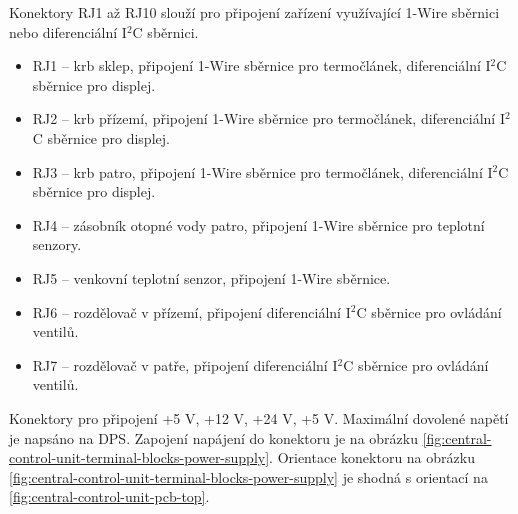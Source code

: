\begin{Czech}
\end{Czech}

\begin{Czech}
Konektory RJ1 až RJ10 slouží pro připojení zařízení využívající 1-Wire sběrnici nebo diferenciální I$^2$C sběrnici.
\end{Czech}

\begin{Czech}
\begin{itemize}
  \item RJ1 – krb sklep, připojení 1-Wire sběrnice pro termočlánek, diferenciální I$^2$C sběrnice pro displej.
  \item RJ2 – krb přízemí, připojení 1-Wire sběrnice pro termočlánek, diferenciální I$^2$C sběrnice pro displej.
  \item RJ3 – krb patro, připojení 1-Wire sběrnice pro termočlánek, diferenciální I$^2$C sběrnice pro displej.
  \item RJ4 – zásobník otopné vody patro, připojení 1-Wire sběrnice pro teplotní senzory.
  \item RJ5 – venkovní teplotní senzor, připojení 1-Wire sběrnice.
  \item RJ6 – rozdělovač v přízemí, připojení diferenciální I$^2$C sběrnice pro ovládání ventilů.
  \item RJ7 – rozdělovač v patře, připojení diferenciální I$^2$C sběrnice pro ovládání ventilů.
\end{itemize}
\end{Czech}

\begin{Czech}
\end{Czech}

\newpage
\begin{Czech}
\end{Czech}

\begin{Czech}
Konektory pro připojení +5 V, +12 V, +24 V, +5 V. Maximální dovolené napětí je napsáno na DPS. Zapojení napájení do konektoru je na obrázku \ref{fig:central-control-unit-terminal-blocks-power-supply}. Orientace konektoru na obrázku \ref{fig:central-control-unit-terminal-blocks-power-supply} je shodná s orientací na \ref{fig:central-control-unit-pcb-top}.
\end{Czech}

